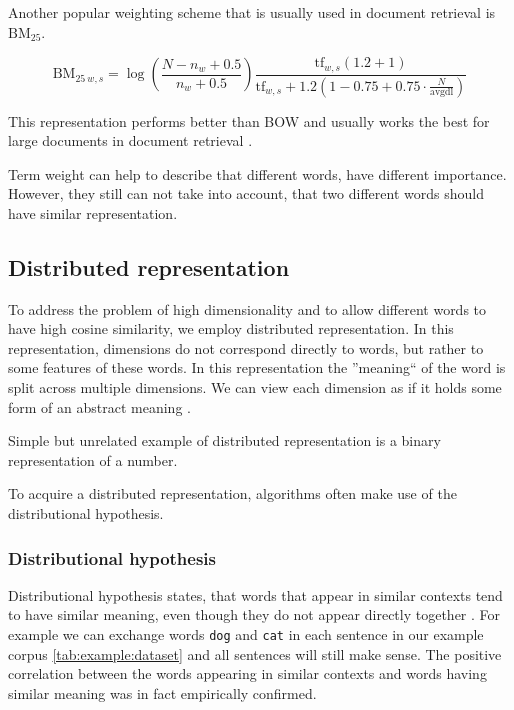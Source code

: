     Another popular weighting scheme that is usually used in document retrieval is $\mathrm{BM_{25}}$. 
    
    $$\mathrm{BM}_{25~w,s} = \log \left(\frac{N-n_w+0.5}{n_w + 0.5}\right)    \frac{\mathrm{tf}_{w,s} (1.2 + 1)}{\mathrm{tf}_{w,s} + 1.2  \left(1 - 0.75 + 0.75 \cdot \frac{N}{\text{avgdl}}\right)}$$
    
    This representation performs better than BOW and usually works the best for large documents in document retrieval \cite{li2014semantic}.
    
    Term weight can help to describe that different words, have different importance.
    However, they still can not take into account, that two different words should have similar representation.
    
    
    \subsection{Distributed representation}
    
    To address the problem of high dimensionality and to allow different words to have high cosine similarity, we employ distributed representation.
    In this representation, dimensions do not correspond directly to words, but rather to some features of these words.
    In this representation the ''meaning`` of the word is split across multiple dimensions.
    We can view each dimension as if it holds some form of an abstract meaning \cite{le2014distributed}. 
    
    Simple but unrelated example of distributed representation is a binary representation of a number.
    
    To acquire a distributed representation, algorithms often make use of the distributional hypothesis.
    \* %

    \subsubsection{Distributional hypothesis}
    
    Distributional hypothesis states, that words that appear in similar contexts tend to have similar meaning,
    even though they do not appear directly together \cite{harris1954distributional} \cite{Rubenstein:1965:CCS:365628.365657}. %
    For example we can exchange words \texttt{dog} and \texttt{cat} in each sentence in our example corpus \ref{tab:example:dataset}
    and all sentences will still make sense. 
    The positive correlation between the words appearing in similar contexts and words having similar meaning was in fact empirically confirmed.
    
